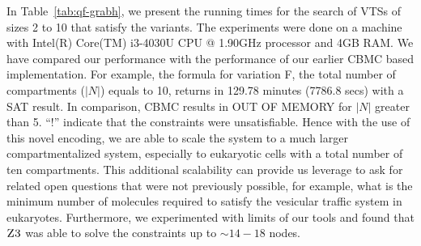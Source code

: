 

In Table~\ref{tab:qf-grabh}, we present the running times for the search of
VTSs of sizes 2 to 10 that satisfy the variants.
%
The experiments were done on a machine with Intel(R) Core(TM) i3-4030U
CPU @ 1.90GHz processor and 4GB RAM.
%
We have compared our performance with the performance of our earlier 
CBMC based implementation.
%
For example, the formula for variation F, the total number of
compartments ($|N|$) equals to 10, returns in 129.78 minutes (7786.8 secs)
with a SAT result.
%
In comparison, CBMC results in OUT OF MEMORY for $|N|$ greater than 5.
%
``!'' indicate that the constraints were unsatisfiable.
%
Hence with the use of this novel encoding, we are able to scale the
system to a much larger compartmentalized system, especially to
eukaryotic cells with a total number of ten compartments.
%
This additional scalability can provide us leverage to ask for related
open questions that were not previously possible, for example, what is
the minimum number of molecules required to satisfy the vesicular
traffic system in eukaryotes.
%
Furthermore, we experimented with limits of our tools and found
that $\textsc{Z3}$ was able to solve the constraints up to $\sim{14-18}$ nodes.



% 






